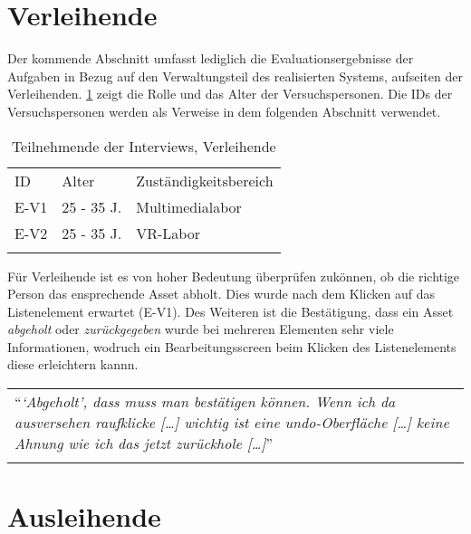 \section{Verleihende}
Der kommende Abschnitt umfasst lediglich die Evaluationsergebnisse der Aufgaben in Bezug auf den
Verwaltungsteil des realisierten Systems, aufseiten der Verleihenden. \ref{table:vzwei}
zeigt die Rolle und das Alter der Versuchspersonen. Die IDs der Versuchspersonen
werden als Verweise in dem folgenden Abschnitt verwendet.

\begin{table}[h]
  \centering
  \caption{Teilnehmende der Interviews, Verleihende}
  \begin{tabular}{lll}
    \arrayrulecolor{maincolor}\hline
    \sffamily\color{maincolor}ID & \sffamily\color{maincolor}Alter &
    \sffamily\color{maincolor}Zuständigkeitsbereich \\
    \arrayrulecolor{maincolor}\hline
    E-V1                         & 25 - 35 J.                      &
    Multimedialabor                                                           \\
    E-V2                        & 25 - 35 J.                      & VR-Labor \\
    \arrayrulecolor{maincolor}\hline
  \end{tabular}
  \label{table:vzwei}
\end{table}

Für Verleihende ist es von hoher Bedeutung überprüfen zukönnen, ob die richtige Person das
ensprechende Asset abholt. Dies wurde nach dem Klicken auf das Listenelement erwartet (E-V1). Des
Weiteren ist die Bestätigung, dass ein Asset \textit{abgeholt} oder \textit{zurückgegeben} wurde bei
mehreren Elementen sehr viele Informationen, wodruch ein Bearbeitungsscreen beim Klicken des
Listenelements diese erleichtern kannn. 

\begin{longtable}{p{}} \arrayrulecolor{maincolor}\hline
  \enquote{\textit{\enquote{Abgeholt}, dass muss man bestätigen können. Wenn ich da ausversehen
  raufklicke [\dots] wichtig ist eine undo-Oberfläche [\dots] keine Ahnung wie ich das jetzt
  zurückhole [\dots]}} \\
  \arrayrulecolor{maincolor}\hline
\end{longtable}

\section{Ausleihende}

